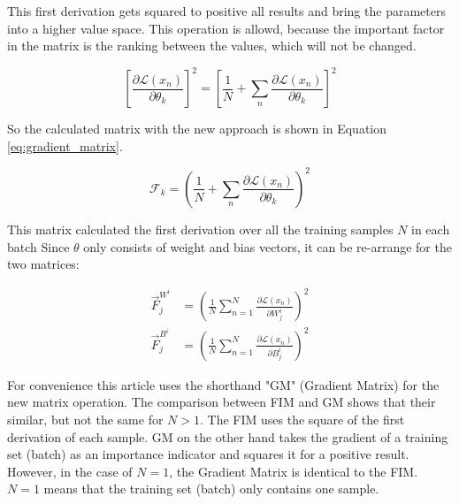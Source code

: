 This first derivation gets squared to positive all results and bring the parameters into a higher value space.
This operation is allowd, because the important factor in the matrix is the ranking between the values, which will not be changed.

\begin{equation}
    \left[
        \frac{\partial \mathcal{L}(x_n)}{\partial \theta_k}
        \right]^2
    = 
    \left[
        \frac{1}{N}
        + \sum_{n} 
            \frac{\partial \mathcal{L}(x_n)}{\partial \theta_k}
        \right]^2
\end{equation}

So the calculated matrix with the new approach is shown in Equation \eqref{eq:gradient_matrix}.

\begin{equation}
    \mathcal{F}_k =
    \left(
        \frac{1}{N}
        + \sum_{n} 
            \frac{\partial \mathcal{L}(x_n)}{\partial \theta_k}
        \right)^2
    \label{eq:gradient_matrix}
\end{equation}

This matrix calculated the first derivation over all the training samples $N$ in each batch
Since $\theta$ only consists of weight and bias vectors, it can be re-arrange for the two matrices:

\begin{equation}
    \begin{split}
        \vec{F}^{W^i}_j & = 
        \left(
            \frac{1}{N} 
            \sum_{n=1}^{N}
            \frac{\partial \mathcal{L} \left( x_n \right) }{\partial W^i_{j}}
        \right)^2
        \\
        \vec{F}^{B^i}_j & = 
        \left(
            \frac{1}{N} 
            \sum_{n=1}^{N} 
            \frac{\partial \mathcal{L} \left( x_n \right) }{\partial B^i_{j}}
        \right)^2
    \end{split}
\end{equation}


For convenience this article uses the shorthand "GM" (Gradient Matrix) for the new matrix operation.
\newline
The comparison between FIM and GM shows that their similar, but not the same for $N > 1$.
The FIM uses the square of the first derivation of each sample. GM on the other hand takes the gradient of a training set (batch) as an importance indicator and squares it for a positive result.
However, in the case of $N=1$, the Gradient Matrix is identical to the FIM.
$N=1$ means that the training set (batch) only contains one sample.

